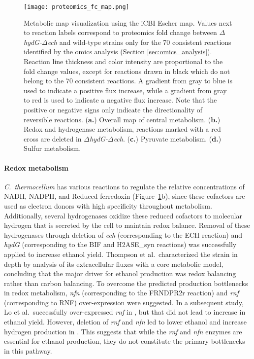 \begin{figure}[p]
    \caption[Metabolic map visualization of proteomics data]{Metabolic map visualization using the iCBI Escher map. Values next to reaction labels correspond to proteomics fold change between \textit{$\Delta$hydG-$\Delta$ech} and wild-type strains only for the 70 consistent reactions identified by the omics analysis (Section \ref{sec:omics_analysis}). Reaction line thickness and color intensity are proportional to the fold change values, except for reactions drawn in black which do not belong to the 70 consistent reactions. A gradient from gray to blue is used to indicate a positive flux increase, while a gradient from gray to red is used to indicate a negative flux increase. Note that the positive or negative signs only indicate the directionality of reversible reactions. (\textbf{a.}) Overall map of central metabolism. (\textbf{b.}) Redox and hydrogenase metabolism, reactions marked with a red cross are deleted in \textit{$\Delta$hydG-$\Delta$ech}. (\textbf{c.}) Pyruvate metabolism. (\textbf{d.}) Sulfur metabolism.}

    \centering
    \texttt{[image: proteomics\_fc\_map.png]}
    \label{fig:map}
\end{figure}

\paragraph{Redox metabolism}
\textit{C.~thermocellum} has various reactions to regulate the relative concentrations of NADH, NADPH, and Reduced ferredoxin (Figure~\ref{fig:map}b), since these cofactors are used as electron donors with high specificity throughout metabolism. Additionally, several hydrogenases oxidize these reduced cofactors to molecular hydrogen that is secreted by the cell to maintain redox balance. Removal of these hydrogenases through deletion of \textit{ech} (corresponding to the ECH reaction) and \textit{hydG} (corresponding to the BIF and H2ASE\_syn reactions) was successfully applied to increase ethanol yield.\citep{biswas2015}
Thompson et al.\citep{thompson2015}\ characterized the  strain in depth by analysis of its extracellular fluxes with a core metabolic model, concluding that the major driver for ethanol production was redox balancing rather than carbon balancing. To overcome the predicted production bottlenecks in redox metabolism, \textit{nfn} (corresponding to the  FRNDPR2r reaction) and \textit{rnf} (corresponding to RNF) over-expression were suggested.
In a subsequent study, Lo et al.\citep{lo2017}\ successfully over-expressed \textit{rnf} in , but that did not lead to increase in ethanol yield. However, deletion of \textit{rnf} and \textit{nfn} led to lower ethanol and increase hydrogen production in . This suggests that while the \textit{rnf} and \textit{nfn} enzymes are essential for ethanol production, they do not constitute the primary bottlenecks in this pathway.

